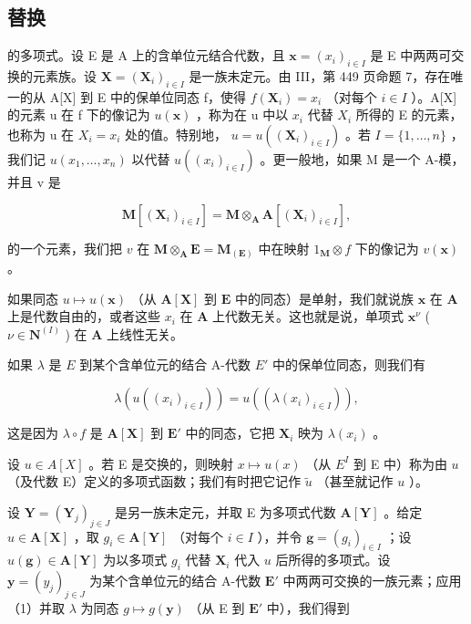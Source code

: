 \subsection{替换}

的多项式。设 E 是 A 上的含单位元结合代数，且 \(\mathbf{x} = (x_{i})_{i \in I}\) 是 E 中两两可交换的元素族。设 \(\mathbf{X} = (\mathbf{X}_{i})_{i \in I}\) 是一族未定元。由 III，第 449 页命题 7，存在唯一的从 A{[}X{]} 到 E 中的保单位同态 f，使得 \(f(\mathbf{X}_{i}) = x_{i}\) （对每个 \(i \in I\) ）。A{[}X{]} 的元素 u 在 f 下的像记为 \(u(\mathbf{x})\) ，称为在 u 中以 \(x_{i}\) 代替 \(X_{i}\) 所得的 E 的元素，也称为 u 在 \(X_{i} = x_{i}\) 处的值。特别地， \(u = u((\mathbf{X}_{i})_{i \in I})\) 。若 \(I = \{1, \ldots, n\}\) ，我们记 \(u(x_{1}, \ldots, x_{n})\) 以代替 \(u((x_{i})_{i \in I})\) 。更一般地，如果 M 是一个 A-模，并且 v 是

\[
\mathbf {M} [ (\mathbf {X} _ {i}) _ {i \in I} ] = \mathbf {M} \otimes_ {\mathbf {A}} \mathbf {A} [ (\mathbf {X} _ {i}) _ {i \in I} ],
\]

的一个元素，我们把 \(v\) 在 \(\mathbf{M} \otimes_{\mathbf{A}} \mathbf{E} = \mathbf{M}_{(\mathbf{E})}\) 中在映射 \(1_{\mathbf{M}} \otimes f\) 下的像记为 \(v(\mathbf{x})\) 。

如果同态 \(u \mapsto u(\mathbf{x})\) （从 \(\mathbf{A}[\mathbf{X}]\) 到 \(\mathbf{E}\) 中的同态）是单射，我们就说族 \(\mathbf{x}\) 在 \(\mathbf{A}\) 上是代数自由的，或者这些 \(x_i\) 在 \(\mathbf{A}\) 上代数无关。这也就是说，单项式 \(\mathbf{x}^\nu\) ( \(\nu \in \mathbf{N}^{(I)}\) ) 在 \(\mathbf{A}\) 上线性无关。

如果 \(\lambda\) 是 \(E\) 到某个含单位元的结合 A-代数 \(E'\) 中的保单位同态，则我们有

\[
\lambda \left(u \left(\left(x _ {i}\right) _ {i \in I}\right)\right) = u \left(\left(\lambda \left(x _ {i}\right) _ {i \in I}\right)\right),\tag{1}
\]

这是因为 \(\lambda \circ f\) 是 \(\mathbf{A}[\mathbf{X}]\) 到 \(\mathbf{E}'\) 中的同态，它把 \(\mathbf{X}_i\) 映为 \(\lambda(x_i)\) 。

设 \(u \in A[X]\) 。若 E 是交换的，则映射 \(x \mapsto u(x)\) （从 \(E^{I}\) 到 E 中）称为由 \(u\) （及代数 E）定义的多项式函数；我们有时把它记作 \(\tilde{u}\) （甚至就记作 \(u\) ）。

设 \(\mathbf{Y} = (\mathbf{Y}_j)_{j\in J}\) 是另一族未定元，并取 E 为多项式代数 \(\mathbf{A}[\mathbf{Y}]\) 。给定 \(u\in \mathbf{A}[\mathbf{X}]\) ，取 \(g_{i}\in \mathbf{A}[\mathbf{Y}]\) （对每个 \(i\in I\) ），并令 \(\mathbf{g} = (g_i)_{i\in I}\) ；设 \(u(\mathbf{g})\in \mathbf{A}[\mathbf{Y}]\) 为以多项式 \(g_{i}\) 代替 \(\mathbf{X}_i\) 代入 \(u\) 后所得的多项式。设 \(\mathbf{y} = (y_j)_{j\in J}\) 为某个含单位元的结合 A-代数 \(\mathbf{E}'\) 中两两可交换的一族元素；应用（1）并取 \(\lambda\) 为同态 \(g\mapsto g(\mathbf{y})\) （从 E 到 \(\mathbf{E}'\) 中），我们得到

